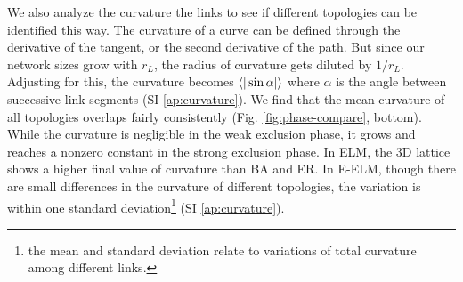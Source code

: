 \documentclass[nofootinbib,preprint,floatfix,endfloats]{revtex4} %
\begin{document}
We also analyze the curvature the links to see if different topologies can be identified this way. The curvature of a curve can be defined through the derivative of the tangent, or the second derivative of the path. But since our network sizes grow with $r_L$, the radius of curvature gets diluted by $1/r_L$. Adjusting for this,  the curvature becomes 
$\be{|\sin\alpha|}$ where $\alpha$ is the angle between successive link segments (SI \ref{ap:curvature}). We find that the mean curvature of all topologies overlaps fairly consistently (Fig. \ref{fig:phase-compare}, bottom). While the curvature is negligible in the weak exclusion phase, it grows and reaches a nonzero constant in the strong exclusion phase. In ELM, the 3D lattice shows a higher final value of curvature than BA and ER. 
In E-ELM, though there are small differences in the curvature of different topologies, the variation is within one standard deviation\footnote{the mean and standard deviation relate to variations of total curvature among different links. } (SI \ref{ap:curvature}).  
\end{document}

